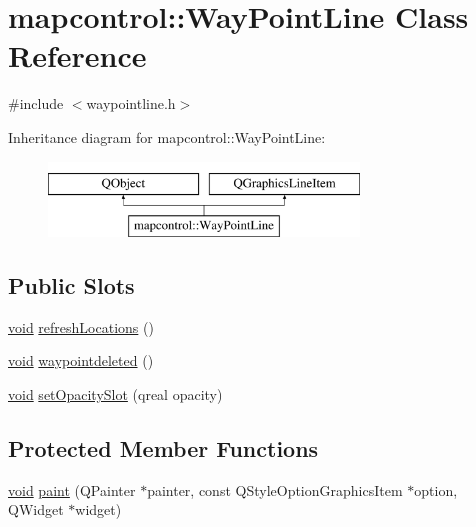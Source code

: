 \hypertarget{classmapcontrol_1_1_way_point_line}{\section{mapcontrol\-:\-:Way\-Point\-Line Class Reference}
\label{classmapcontrol_1_1_way_point_line}
}


{\ttfamily \#include $<$waypointline.\-h$>$}

Inheritance diagram for mapcontrol\-:\-:Way\-Point\-Line\-:\begin{figure}[H]
\begin{center}
\leavevmode
\includegraphics[height=2.000000cm]{classmapcontrol_1_1_way_point_line}
\end{center}
\end{figure}
\subsection*{Public Slots}
\begin{DoxyCompactItemize}
\item 
\hyperlink{group___u_a_v_objects_plugin_ga444cf2ff3f0ecbe028adce838d373f5c}{void} \hyperlink{group___o_p_map_widget_ga172c303dfa7505c919d0a6dab7cb5bc1}{refresh\-Locations} ()
\item 
\hyperlink{group___u_a_v_objects_plugin_ga444cf2ff3f0ecbe028adce838d373f5c}{void} \hyperlink{group___o_p_map_widget_ga507019eb072fcd6904290dadf39a11ef}{waypointdeleted} ()
\item 
\hyperlink{group___u_a_v_objects_plugin_ga444cf2ff3f0ecbe028adce838d373f5c}{void} \hyperlink{group___o_p_map_widget_ga352adc3521d31339f2693ad55de5e1d7}{set\-Opacity\-Slot} (qreal opacity)
\end{DoxyCompactItemize}
\subsection*{Protected Member Functions}
\begin{DoxyCompactItemize}
\item 
\hyperlink{group___u_a_v_objects_plugin_ga444cf2ff3f0ecbe028adce838d373f5c}{void} \hyperlink{group___o_p_map_widget_ga7e02fb7136fabae7e6ffe0e8db29e747}{paint} (Q\-Painter $\ast$painter, const Q\-Style\-Option\-Graphics\-Item $\ast$option, Q\-Widget $\ast$widget)
\end{DoxyCompactItemize}


